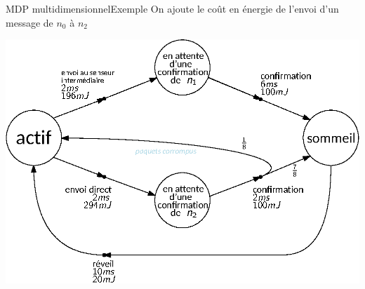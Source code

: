 \documentclass[compress]{beamer}
\theoremstyle{theorem}%
\begin{document}
\begin{frame}{MDP multidimensionnel}{Exemple}
    On ajoute le coût en énergie de l'envoi d'un message de $n_0$ à $n_2$
  \begin{center}
    \includegraphics[width=0.7\linewidth]{resources/mdpmdp}
  \end{center}
\end{frame}
\end{document}
